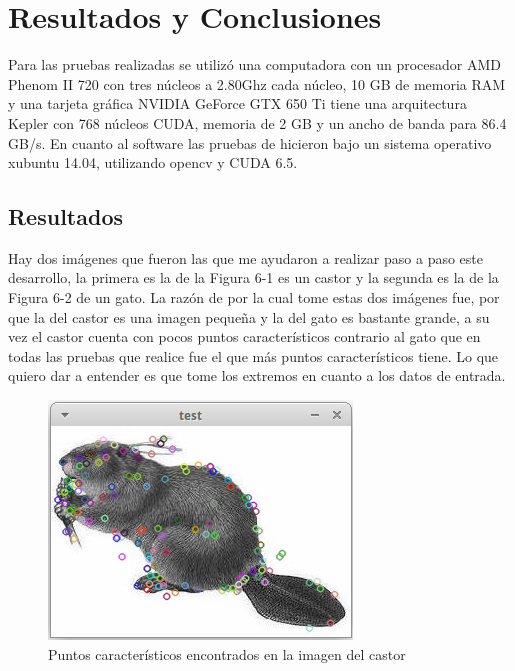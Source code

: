 

\chapter{Resultados y Conclusiones}

Para las pruebas realizadas se utilizó una computadora con un procesador AMD Phenom II 720 con tres núcleos a 2.80Ghz cada núcleo, 10 GB de memoria RAM y una tarjeta gráfica NVIDIA GeForce GTX 650 Ti tiene una arquitectura Kepler con 768 núcleos CUDA, memoria de 2 GB y un ancho de banda para 86.4 GB/s. En cuanto al software las pruebas de hicieron bajo un sistema operativo xubuntu 14.04, utilizando opencv y CUDA 6.5.

\section{Resultados}

Hay dos imágenes que fueron las que me ayudaron a realizar paso a paso este desarrollo, la primera es la de la Figura 6-1 es un castor y la segunda es la de la Figura 6-2 de un gato. La razón de por la cual tome estas dos imágenes fue, por que la del castor es una imagen pequeña y la del gato es bastante grande, a su vez el castor cuenta con pocos puntos característicos contrario al gato que en todas las pruebas que realice fue el que más puntos característicos tiene. Lo que quiero dar a entender es que tome los extremos en cuanto a los datos de entrada. 

\begin{figure}[ph]
			\centering
				\includegraphics[scale=1]{img/castor.png}
			\caption{Puntos característicos encontrados en la imagen del castor}
\end{figure}


